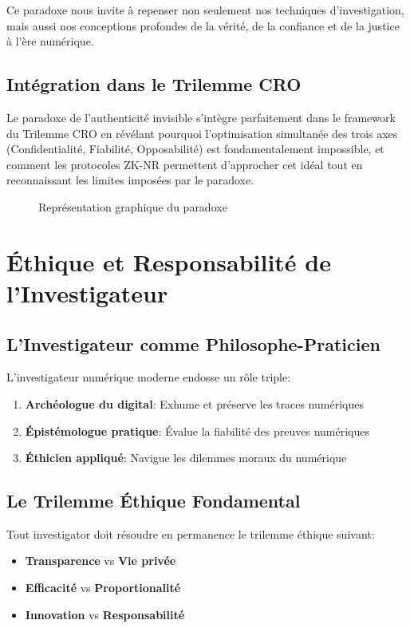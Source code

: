 Ce paradoxe nous invite à repenser non seulement nos techniques d'investigation, mais aussi nos conceptions profondes de la vérité, de la confiance et de la justice à l'ère numérique.

\subsection{Intégration dans le Trilemme CRO}
Le paradoxe de l'authenticité invisible s'intègre parfaitement dans le framework du Trilemme CRO en révélant pourquoi l'optimisation simultanée des trois axes (Confidentialité, Fiabilité, Opposabilité) est fondamentalement impossible, et comment les protocoles ZK-NR permettent d'approcher cet idéal tout en reconnaissant les limites imposées par le paradoxe.

\begin{figure}[H]
\centering
{}
\caption{Représentation graphique du paradoxe}
\end{figure}

\section{Éthique et Responsabilité de l'Investigateur}
\subsection{L'Investigateur comme Philosophe-Praticien}
L'investigateur numérique moderne endosse un rôle triple:
\begin{enumerate}
\item \textbf{Archéologue du digital}: Exhume et préserve les traces numériques
\item \textbf{Épistémologue pratique}: Évalue la fiabilité des preuves numériques
\item \textbf{Éthicien appliqué}: Navigue les dilemmes moraux du numérique
\end{enumerate}

\subsection{Le Trilemme Éthique Fondamental}
Tout investigator doit résoudre en permanence le trilemme éthique suivant:
\begin{itemize}
\item \textbf{Transparence} vs \textbf{Vie privée}
\item \textbf{Efficacité} vs \textbf{Proportionalité}
\item \textbf{Innovation} vs \textbf{Responsabilité}
\end{itemize}


